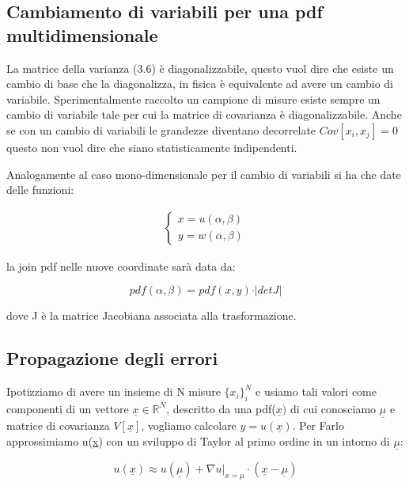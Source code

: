 \documentclass[11pt,a4paper]{book}
\begin{document}
\subsection{Cambiamento di variabili per una pdf \\ multidimensionale}

La matrice della varianza (3.6) \`{e} diagonalizzabile, questo vuol dire che esiste un cambio di base che la diagonalizza, in fisica \`{e} equivalente ad avere un cambio di variabile. Sperimentalmente raccolto un campione di misure esiste sempre un cambio di variabile tale per cui la matrice di covarianza \`{e} diagonalizzabile. Anche se con un cambio di variabili le grandezze diventano decorrelate $Cov[x_i,x_j] = 0$ questo non vuol dire che siano statisticamente indipendenti.

Analogamente al caso mono-dimensionale per il cambio di variabili si ha che date delle funzioni:

\begin{align*}
	\begin{cases}
		x = u(\alpha,\beta)\\
		y = w(\alpha, \beta)
	\end{cases}
\end{align*}

la join pdf nelle nuove coordinate sar\`{a} data da:

\begin{equation}
	pdf(\alpha, \beta) = pdf(x,y) \cdot \vert detJ\vert
\end{equation}

dove J \`{e} la matrice Jacobiana associata alla trasformazione.
\subsection{Propagazione degli errori}

Ipotizziamo di avere un insieme di N misure $\{x_i\}_i^N$ e usiamo tali valori come componenti di un vettore $\underline{x} \in \mathbb{R}^N$, descritto da una pdf($\underline{x})$ di cui conosciamo $\underline{\mu}$ e matrice di covarianza $V[\underline{x}]$, vogliamo calcolare $y = u(\underline{x})$. Per Farlo approssimiamo u(\underline{x}) con un sviluppo di Taylor al primo ordine in un intorno di $\underline{\mu}$:

\begin{equation*}
	u(\underline{x}) \approx u(\underline{\mu})+ \nabla u\big \vert_{x = \mu}\cdot (\underline{x} - \underline{\mu})
\end{equation*}
\end{document}
